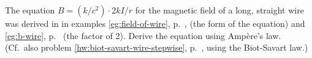 The equation $B=(k/c^2)\cdot 2kI/r$ for the magnetic field of a long, straight wire was derived in
in examples \ref{eg:field-of-wire}, p.~\pageref{eg:field-of-wire}, (the form of the equation) and
\ref{eg:b-wire}, p.~\pageref{eg:b-wire} (the factor of 2).
Derive the equation using Amp\`{e}re's law. (Cf.~also problem \ref{hw:biot-savart-wire-stepwise},
p.~\pageref{hw:biot-savart-wire-stepwise}, using the Biot-Savart law.)
